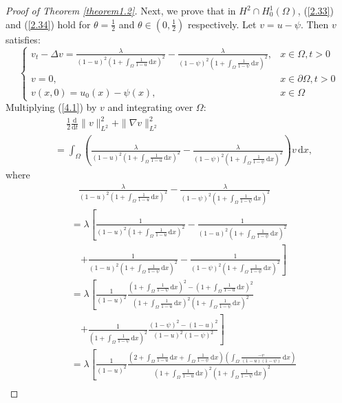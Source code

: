 \documentclass{article}
\numberwithin{equation}{section}
\begin{document}
\begin{proof}[Proof of Theorem \ref{theorem1.2}]
  Next, we prove that in $H^2\cap H_0^1(\Omega)$, (\ref{2.33}) and (\ref{2.34}) hold for $\theta=\frac{1}{2}$ and $\theta\in (0,\frac{1}{2})$ respectively.
  Let $v=u-\psi$. Then $v$ satisfies:
  \begin{equation}
    \begin{cases}
        v_{t}-\Delta v=\frac{\lambda}{(1-u)^2(1+\int_{\Omega}\frac{1}{1-u}\,\mathrm{d}x)^2}-\frac{\lambda}{(1-\psi)^2(1+\int_{\Omega}\frac{1}{1-\psi}\,\mathrm{d}x)^2},&x\in\Omega,t>0\\
        v=0,&x\in\partial\Omega,t>0\\
        v(x,0)=u_0(x)-\psi(x),&x\in\Omega
    \end{cases}\label{4.1}
\end{equation}
  Multiplying (\ref{4.1}) by $v$ and integrating over $\Omega$:
\begin{align*}
    &\quad\ \ \frac{1}{2}\frac{\mathrm{d}}{\mathrm{d}t}\|v\|_{L^2}^2+\|\nabla v\|_{L^2}^2\\
    &\ =\int_{\Omega}\left(\frac{\lambda}{(1-u)^2(1+\int_{\Omega}\frac{1}{1-u}\,\mathrm{d}x)^2}-\frac{\lambda}{(1-\psi)^2(1+\int_{\Omega}\frac{1}{1-\psi}\,\mathrm{d}x)^2}\right)v\,\mathrm{d}x,
\end{align*}
where
\begin{align*}
    &\quad\frac{\lambda}{(1-u)^2(1+\int_{\Omega}\frac{1}{1-u}\,\mathrm{d}x)^2}-\frac{\lambda}{(1-\psi)^2(1+\int_{\Omega}\frac{1}{1-\psi}\,\mathrm{d}x)^2}\\
    &\ =\lambda\left[\frac{1}{(1-u)^2(1+\int_{\Omega}\frac{1}{1-u}\,\mathrm{d}x)^2}-\frac{1}{(1-u)^2(1+\int_{\Omega}\frac{1}{1-\psi}\,\mathrm{d}x)^2}\right.\\
    &\quad\ \left.+\frac{1}{(1-u)^2(1+\int_{\Omega}\frac{1}{1-\psi}\,\mathrm{d}x)^2}-\frac{1}{(1-\psi)^2(1+\int_{\Omega}\frac{1}{1-\psi}\,\mathrm{d}x)^2}\right]\\
    &\ =\lambda\left[\frac{1}{(1-u)^2}\frac{(1+\int_{\Omega}\frac{1}{1-\psi}\,\mathrm{d}x)^2-(1+\int_{\Omega}\frac{1}{1-u}\,\mathrm{d}x)^2}{(1+\int_{\Omega}\frac{1}{1-u}\,\mathrm{d}x)^2(1+\int_{\Omega}\frac{1}{1-\psi}\,\mathrm{d}x)^2}\right.\\
    &\quad\ \left.+\frac{1}{(1+\int_{\Omega}\frac{1}{1-\psi}\,\mathrm{d}x)^2}\frac{(1-\psi)^2-(1-u)^2}{(1-u)^2(1-\psi)^2}\right]\\
    &\ =\lambda\left[\frac{1}{(1-u)^2}\frac{(2+\int_{\Omega}\frac{1}{1-u}\,\mathrm{d}x+\int_{\Omega}\frac{1}{1-\psi}\,\mathrm{d}x)(\int_{\Omega}\frac{-v}{(1-u)(1-\psi)}\,\mathrm{d}x)}{(1+\int_{\Omega}\frac{1}{1-u}\,\mathrm{d}x)^2(1+\int_{\Omega}\frac{1}{1-\psi}\,\mathrm{d}x)^2}\right.\\

\end{align*}
\end{proof}
\end{document}
